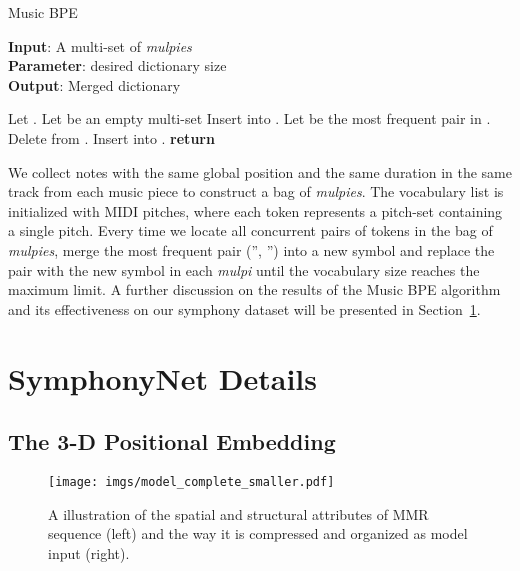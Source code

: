 \documentclass{article}
\begin{document}
\begin{algorithm}[ht]
\caption{Music BPE}
\label{alg:pimbpe}
\textbf{Input}: A multi-set of \emph{mulpies}   \\
\textbf{Parameter}: desired dictionary size \\
\textbf{Output}: Merged dictionary  
\begin{algorithmic}[1] \STATE Let .
\STATE Let  be an empty multi-set
\FORALL{}
\STATE 
\FORALL{}
\STATE Insert  into .
\ENDFOR
\ENDFOR
\WHILE{} \STATE Let  be the most frequent pair in .
\STATE  \FORALL{}
\IF{}
\FORALL{}
\STATE Delete  from .
\STATE Insert  into .
\ENDFOR
\STATE 
\ENDIF
\ENDFOR
\ENDWHILE
\STATE \textbf{return} 
\end{algorithmic}
\end{algorithm}
We collect notes with the same global position and the same duration in the same track from each music piece to construct a bag of \emph{mulpies}. The vocabulary list is initialized with  MIDI pitches, where each token represents a pitch-set containing a single pitch. Every time we locate all concurrent pairs of tokens in the bag of \emph{mulpies}, merge the most frequent pair ('', '') into a new symbol  and replace the pair with the new symbol in each \emph{mulpi} until the vocabulary size reaches the maximum limit. A further discussion on the results of the Music BPE algorithm and its effectiveness on our symphony dataset will be presented in Section~\ref{symphonyNet}.
\nopagebreak
\section{SymphonyNet Details} 
\label{symphonyNet}

\subsection{The 3-D Positional Embedding}
\begin{figure*}[ht]
  \centering
  \centerline{\texttt{[image: imgs/model\_complete\_smaller.pdf]}}
  \caption{A illustration of the spatial and structural attributes of MMR sequence (left) and the way it is compressed and organized as model input (right).}
  \label{fig:model}
\end{figure*}
\end{document}
